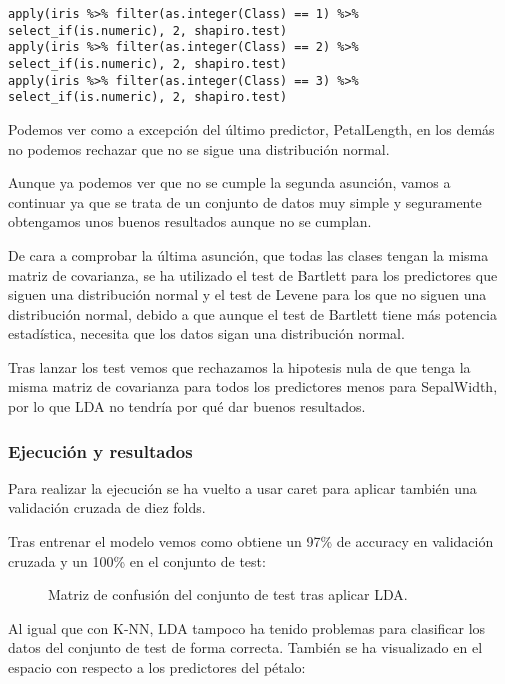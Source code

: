 \begin{lstlisting}
apply(iris %>% filter(as.integer(Class) == 1) %>% select_if(is.numeric), 2, shapiro.test)
apply(iris %>% filter(as.integer(Class) == 2) %>% select_if(is.numeric), 2, shapiro.test)
apply(iris %>% filter(as.integer(Class) == 3) %>% select_if(is.numeric), 2, shapiro.test)
\end{lstlisting}

Podemos ver como a excepción del último predictor, PetalLength, en los demás no podemos rechazar que no se sigue una distribución normal.

Aunque ya podemos ver que no se cumple la segunda asunción, vamos a continuar ya que se trata de un conjunto de datos muy simple y seguramente obtengamos unos buenos resultados aunque no se cumplan.


De cara a comprobar la última asunción, que todas las clases tengan la misma matriz de covarianza, se ha utilizado el test de Bartlett para los predictores que siguen una distribución normal y el test de Levene para los que no siguen una distribución normal, debido a que aunque el test de Bartlett tiene más potencia estadística, necesita que los datos sigan una distribución normal.

Tras lanzar los test vemos que rechazamos la hipotesis nula de que tenga la misma matriz de covarianza para todos los predictores menos para SepalWidth, por lo que LDA no tendría por qué dar buenos resultados.

\subsubsection{Ejecución y resultados}

Para realizar la ejecución se ha vuelto a usar caret para aplicar también una validación cruzada de diez folds.

Tras entrenar el modelo vemos como obtiene un 97\% de accuracy en validación cruzada y un 100\% en el conjunto de test:

\begin{figure}[H]
	\centering
	
	\caption{Matriz de confusión del conjunto de test tras aplicar LDA.}
	\label{fig:matriz_confusion_lda}
\end{figure}

Al igual que con K-NN, LDA tampoco ha tenido problemas para clasificar los datos del conjunto de test de forma correcta. También se ha visualizado en el espacio con respecto a los predictores del pétalo:

